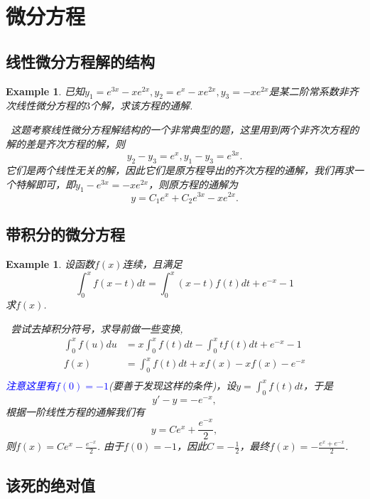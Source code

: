 \documentclass{article}
\newtheorem{example}[theorem]{Example}
\newcommand{\hints}{{\color{blue} \text{hints}}}
\newcommand{\bluet}[1]{\textcolor{blue}{#1}}
\begin{document}
\newpage
\section{微分方程}

\subsection{线性微分方程解的结构}

\begin{example}
\rm 已知$y_1 = e^{3x}-xe^{2x},y_2 = e^x - xe^{2x},y_3 = -xe^{2x}$是某二阶常系数非齐次线性微分方程的$3$个解，求该方程的通解.

\hints\ 这题考察线性微分方程解结构的一个非常典型的题，这里用到两个非齐次方程的解的差是齐次方程的解，则
$$
y_2  - y_3 = e^x , y_1 - y_3 = e^{3x}.
$$
它们是两个线性无关的解，因此它们是原方程导出的齐次方程的通解，我们再求一个特解即可，即$y_1-e^{3x} = -xe^{2x}$，则原方程的通解为
$$
y=C_1e^x + C_2e^{3x}-xe^{2x}. 
$$
\end{example}

\subsection{带积分的微分方程}

\begin{example}
\rm 设函数$f(x)$连续，且满足
$$
\int_0^x f(x-t)dt = \int_0^x (x-t)f(t)dt +e^{-x}-1
$$
求$f(x)$.

\hints\ 尝试去掉积分符号，求导前做一些变换,
$$
\begin{array}{rl}
\int_0^x f(u)du &= x\int_0^x f(t)dt - \int_0^x tf(t)dt + e^{-x}-1 \\
f(x) &= \int_0^x f(t)dt + xf(x)-xf(x)-e^{-x} \\
\end{array}
$$
\bluet{注意这里有$f(0)=-1$}(要善于发现这样的条件)，设$y = \int_0^x f(t)dt$，于是
$$
y'-y = -e^{-x},
$$
根据一阶线性方程的通解我们有
$$
y = Ce^x + \frac{e^{-x}}{2},
$$
则$f(x) = Ce^x -\frac{e^{-x}}{2}$. 由于$f(0)=-1$，因此$C=-\frac{1}{2}$，最终$f(x)= -\frac{e^{x}+e^{-x}}{2}$. 
\end{example}

\newpage
\subsection{该死的绝对值}
\end{document}
